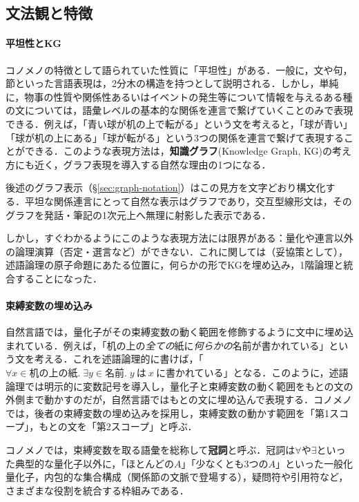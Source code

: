 \documentclass[../../main-detail.tex]{subfiles}
\begin{document}
\subsection{文法観と特徴}\label{sec:grammar-view}
\paragraph{平坦性とKG}\label{par:flat-kg}
コノメノの特徴として語られていた性質に「平坦性」がある．一般に，文や句，節といった言語表現は，2分木の構造を持つとして説明される．しかし，単純に，物事の性質や関係性あるいはイベントの発生等について情報を与えるある種の文については，語彙レベルの基本的な関係を連言で繋げていくことのみで表現できる．例えば，「青い球が机の上で転がる」という文を考えると，「球が青い」「球が机の上にある」「球が転がる」という3つの関係を連言で繋げて表現することができる．このような表現方法は，\textbf{知識グラフ}(Knowledge Graph, KG)の考え方にも近く，グラフ表現を導入する自然な理由の1つになる．

後述のグラフ表示（\S\ref{sec:graph-notation}）はこの見方を文字どおり構文化する．平坦な関係連言にとって自然な表示はグラフであり，交互型線形文は，そのグラフを発話・筆記の1次元上へ無理に射影した表示である．

しかし，すぐわかるようにこのような表現方法には限界がある：量化や連言以外の論理演算（否定・選言など）ができない．これに関しては（妥協策として），述語論理の原子命題にあたる位置に，何らかの形でKGを埋め込み，1階論理と統合することになった．

\paragraph{束縛変数の埋め込み} 自然言語では，量化子がその束縛変数の動く範囲を修飾するように文中に埋め込まれている．例えば，「机の上の\emph{全ての}紙に\emph{何らかの}名前が書かれている」という文を考える．これを述語論理的に書けば，「$\forall x \in \text{机の上の紙}.\; \exists y \in \text{名前}.\; y\ \text{は}\ x\ \text{に書かれている}$」となる．このように，述語論理では明示的に変数記号を導入し，量化子と束縛変数の動く範囲をもとの文の外側まで動かすのだが，自然言語ではもとの文に埋め込んで表現する．コノメノでは，後者の束縛変数の埋め込みを採用し，束縛変数の動かす範囲を「第1スコープ」，もとの文を「第2スコープ」と呼ぶ．

コノメノでは，束縛変数を取る語彙を総称して\textbf{冠詞}と呼ぶ．冠詞は$\forall$や$\exists$といった典型的な量化子以外に，「ほとんどの$A$」「少なくとも3つの$A$」といった一般化量化子，内包的な集合構成（関係節の文脈で登場する），疑問符や引用符など，さまざまな役割を統合する枠組みである．
\end{document}
